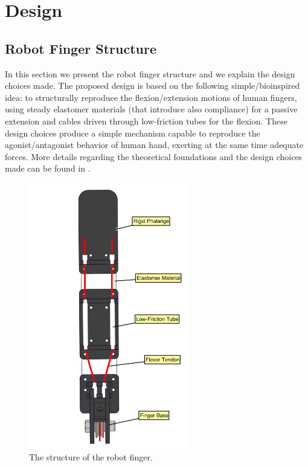 \newpage

\section{Design}

\subsection{Robot Finger Structure}

 In this section we present the robot finger structure and we explain the design choices made. The proposed design is based on the following simple/bioinspired idea: to structurally reproduce the flexion/extension motions of human fingers, using steady elastomer materials (that introduce also compliance) for a passive extension and cables driven through low-friction tubes for the flexion. These design choices produce a simple mechanism capable to reproduce the agonist/antagonist behavior of human hand, exerting at the same time adequate forces. More details regarding the theoretical foundations and the design choices made can be found in \cite{Zisimatos2014IROS}.\\

\begin{figure}
 	\vspace{10pt}
 	\begin{center}
\includegraphics[width=7cm]{figures/Intro/Fig1-2.png}
 	\end{center}
 	\vspace{0pt}
 	\caption{The structure of the robot finger.}
	\label{Finger}
 	\vspace{0pt}
\end{figure}


